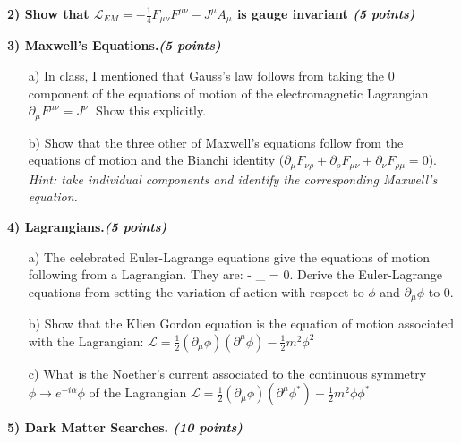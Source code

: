 {\textbf{2) Show that  $\mathscr{L}_{EM} = -\frac{1}{4}F_{\mu\nu}F^{\mu\nu} - J^{\mu}A_{\mu}$ is gauge invariant \hfill \textit{(5 points)}}


\vspace*{0.25in}




\textbf{3) Maxwell’s Equations.\hfill \textit{(5 points)}}
\begin{itemize}
\item[a)]In class,  I mentioned  that Gauss’s law follows from taking the 0 component of the equations of motion of the electromagnetic Lagrangian $\partial_\mu F^{\mu\nu} = J^\nu$. 
Show this explicitly.
\item[b)]Show that the three other of Maxwell’s equations follow from the equations of motion and the Bianchi identity ($\partial_\mu F_{\nu\rho} +\partial_\rho F_{\mu\nu} +\partial_\nu F_{\rho\mu} =0$). \textit{Hint: take individual components and identify the corresponding Maxwell’s equation.}
\end{itemize}

\vspace*{0.25in}

\textbf{4) Lagrangians.\hfill \textit{(5 points)}}
\begin{itemize}
\item[a)]The celebrated Euler-Lagrange equations give the equations of motion following from a Lagrangian. 
They are: 
\be
{} - \partial_\mu {} = 0.
\ee
Derive the Euler-Lagrange equations from setting the variation of action with respect to $\phi$ and $\partial_\mu \phi$  to 0.
\item[b)]Show that the Klien Gordon equation is the equation of motion associated with the Lagrangian: $\mathscr{L}= \frac{1}{2}(\partial_\mu \phi)(\partial^{\mu}\phi) - \frac{1}{2}m^2\phi^2$
\item[c)]What is the Noether's current associated to the continuous symmetry $\phi \rightarrow e^{-i\alpha} \phi$ of the Lagrangian $\mathscr{L}= \frac{1}{2}(\partial_\mu \phi)(\partial^{\mu}\phi^*) - \frac{1}{2}m^2\phi\phi^*$
\end{itemize}

\vspace*{0.25in}

\textbf{5) Dark Matter Searches. \hfill \textit{(10 points)}}

}
